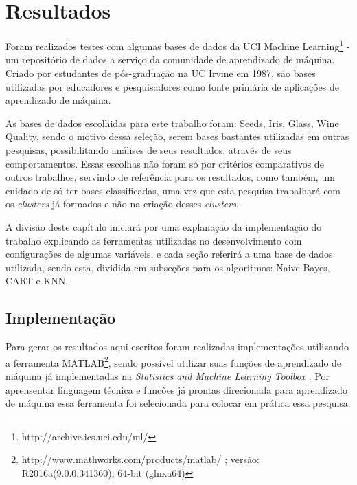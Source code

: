 \chapter{Resultados}\label{cap:resultados}

Foram realizados testes com algumas bases de dados da UCI Machine Learning\footnote{http://archive.ics.uci.edu/ml/} - um repositório de dados a serviço da comunidade de aprendizado de máquina. Criado por estudantes de pós-graduação na UC Irvine em 1987, são bases utilizadas por educadores e pesquisadores como fonte primária de aplicações de aprendizado de máquina. 


As bases de dados escolhidas para este trabalho foram: Seeds, Iris, Glass, Wine Quality, sendo o motivo dessa seleção, serem bases bastantes utilizadas em outras pesquisas,  possibilitando análises de seus resultados, através de seus comportamentos. Essas escolhas não foram só por critérios comparativos de outros trabalhos, servindo  de referência para os resultados, como também, um cuidado de só ter bases classificadas, uma vez que esta pesquisa trabalhará com os \textit{clusters} já formados e não na criação desses \textit{clusters}.

A divisão deste capítulo iniciará por uma explanação da implementação do trabalho explicando as ferramentas  utilizadas no desenvolvimento com configurações  de algumas variáveis, e cada seção referirá a uma base de dados utilizada, sendo esta, dividida em subseções para os algoritmos: Naive Bayes, CART e KNN.

\section{Implementação}\label{cap:resultados:sec:implement}

Para  gerar os resultados aqui escritos foram realizadas implementações utilizando a ferramenta MATLAB\footnote{http://www.mathworks.com/products/matlab/ ; versão: R2016a(9.0.0.341360); 64-bit (glnxa64)}, sendo possível utilizar suas funções de aprendizado de máquina já implementadas na \textit{Statistics and Machine Learning Toolbox }. Por aprensentar  linguagem técnica e funcões já prontas direcionada para aprendizado de máquina essa ferramenta foi selecionada para colocar em prática essa pesquisa.

